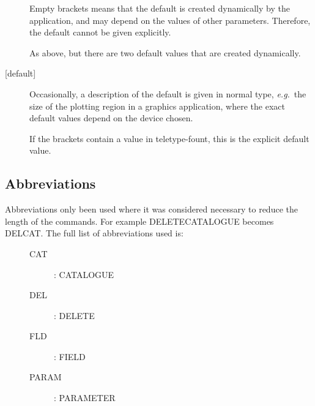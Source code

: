 \begin{description}

\item[{\mantt []}]
Empty brackets means that the default is created dynamically
by the application, and may depend on the values of other parameters.
Therefore, the default cannot be given explicitly.

\item[{\mantt [,]}]
As above, but there are two default values that are created dynamically.

\item[{\mantt [}{\rm default}{\mantt ]}]
Occasionally, a description of the default is given in normal type,
{\it e.g.}\ the size of the plotting region in a graphics application,
where the exact default values depend on the device chosen. 

\item[{\mantt [default]}]
If the brackets contain a value in teletype-fount, this is the explicit
default value.

\end{description}

\subsection{Abbreviations}

Abbreviations  only been used where it was considered necessary to reduce
the length of the commands. For example  {\small DELETECATALOGUE} becomes
{\small DELCAT}. The full list of abbreviations used is:

\begin{description}
\item[\mbox{}]\mbox{}
\begin{description}
\item [CAT]: CATALOGUE
\item [DEL]: DELETE
\item [FLD]: FIELD
\item [PARAM]: PARAMETER
\end{description}
\end{description}





